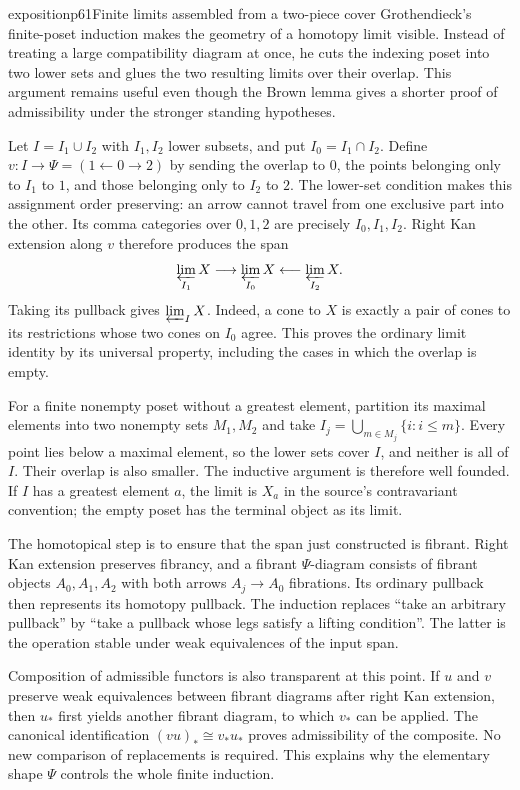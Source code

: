 \begin{dcomment}{exposition}{p61}{Finite limits assembled from a two-piece cover}
Grothendieck's finite-poset induction makes the geometry of a homotopy limit visible. Instead of treating a large compatibility diagram at once, he cuts the indexing poset into two lower sets and glues the two resulting limits over their overlap. This argument remains useful even though the Brown lemma gives a shorter proof of admissibility under the stronger standing hypotheses.

Let $I=I_1\cup I_2$ with $I_1,I_2$ lower subsets, and put $I_0=I_1\cap I_2$. Define $v:I\to\Psi=(1\leftarrow0\to2)$ by sending the overlap to $0$, the points belonging only to $I_1$ to $1$, and those belonging only to $I_2$ to $2$. The lower-set condition makes this assignment order preserving: an arrow cannot travel from one exclusive part into the other. Its comma categories over $0,1,2$ are precisely $I_0,I_1,I_2$. Right Kan extension along $v$ therefore produces the span
\[
 \varprojlim_{I_1}X\longrightarrow\varprojlim_{I_0}X
 \longleftarrow\varprojlim_{I_2}X.
\]
Taking its pullback gives $\varprojlim_I X$. Indeed, a cone to $X$ is exactly a pair of cones to its restrictions whose two cones on $I_0$ agree. This proves the ordinary limit identity by its universal property, including the cases in which the overlap is empty.

For a finite nonempty poset without a greatest element, partition its maximal elements into two nonempty sets $M_1,M_2$ and take $I_j=\bigcup_{m\in M_j}\{i:i\leq m\}$. Every point lies below a maximal element, so the lower sets cover $I$, and neither is all of $I$. Their overlap is also smaller. The inductive argument is therefore well founded. If $I$ has a greatest element $a$, the limit is $X_a$ in the source's contravariant convention; the empty poset has the terminal object as its limit.

The homotopical step is to ensure that the span just constructed is fibrant. Right Kan extension preserves fibrancy, and a fibrant $\Psi$-diagram consists of fibrant objects $A_0,A_1,A_2$ with both arrows $A_j\to A_0$ fibrations. Its ordinary pullback then represents its homotopy pullback. The induction replaces ``take an arbitrary pullback'' by ``take a pullback whose legs satisfy a lifting condition''. The latter is the operation stable under weak equivalences of the input span.

Composition of admissible functors is also transparent at this point. If $u$ and $v$ preserve weak equivalences between fibrant diagrams after right Kan extension, then $u_*$ first yields another fibrant diagram, to which $v_*$ can be applied. The canonical identification $(vu)_*\cong v_*u_*$ proves admissibility of the composite. No new comparison of replacements is required. This explains why the elementary shape $\Psi$ controls the whole finite induction.
\end{dcomment}


